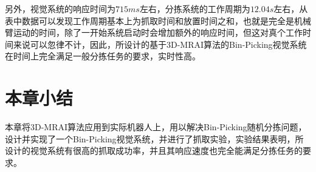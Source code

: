 另外，视觉系统的响应时间为$715ms$左右，分拣系统的工作周期为$12.04s$左右，从表中数据可以发现工作周期基本上为抓取时间和放置时间之和，也就是完全是机械臂运动的时间，除了一开始系统启动时会增加额外的响应时间，但这对真个工作时间来说可以忽律不计，因此，所设计的基于3D-MRAI算法的Bin-Picking视觉系统在时间上完全满足一般分拣任务的要求，实时性高。

\section{本章小结}
本章将3D-MRAI算法应用到实际机器人上，用以解决Bin-Picking随机分拣问题，设计并实现了一个Bin-Picking视觉系统，并进行了抓取实验，实验结果表明，所设计的视觉系统有很高的抓取成功率，并且其响应速度也完全能满足分拣任务的要求。

